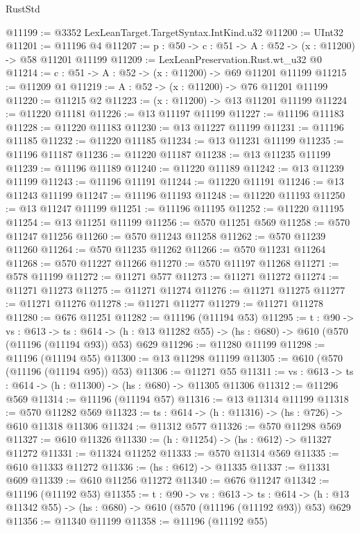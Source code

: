 \begin{lexlean}{RustStd}
\begin{coremodule}
@11199 := @3352 LexLeanTarget.TargetSyntax.IntKind.u32
@11200 := UInt32
@11201 := @11196 @4
@11207 := {p : @50} -> {c : @51} -> {A : @52} -> (x : @11200) -> @58 @11201 @11199
@11209 := LexLeanPreservation.Rust.wt_u32 @0
@11214 := {c : @51} -> {A : @52} -> (x : @11200) -> @69 @11201 @11199
@11215 := @11209 @1
@11219 := {A : @52} -> (x : @11200) -> @76 @11201 @11199
@11220 := @11215 @2
@11223 := (x : @11200) -> @13 @11201 @11199
@11224 := @11220 @11181
@11226 := @13 @11197 @11199
@11227 := @11196 @11183
@11228 := @11220 @11183
@11230 := @13 @11227 @11199
@11231 := @11196 @11185
@11232 := @11220 @11185
@11234 := @13 @11231 @11199
@11235 := @11196 @11187
@11236 := @11220 @11187
@11238 := @13 @11235 @11199
@11239 := @11196 @11189
@11240 := @11220 @11189
@11242 := @13 @11239 @11199
@11243 := @11196 @11191
@11244 := @11220 @11191
@11246 := @13 @11243 @11199
@11247 := @11196 @11193
@11248 := @11220 @11193
@11250 := @13 @11247 @11199
@11251 := @11196 @11195
@11252 := @11220 @11195
@11254 := @13 @11251 @11199
@11256 := @570 @11251 @569
@11258 := @570 @11247 @11256
@11260 := @570 @11243 @11258
@11262 := @570 @11239 @11260
@11264 := @570 @11235 @11262
@11266 := @570 @11231 @11264
@11268 := @570 @11227 @11266
@11270 := @570 @11197 @11268
@11271 := @578 @11199
@11272 := @11271 @577
@11273 := @11271 @11272
@11274 := @11271 @11273
@11275 := @11271 @11274
@11276 := @11271 @11275
@11277 := @11271 @11276
@11278 := @11271 @11277
@11279 := @11271 @11278
@11280 := @676 @11251
@11282 := @11196 (@11194 @53)
@11295 := {t : @90} ->
  {vs : @613} ->
  {ts : @614} -> (h : @13 @11282 @55) -> (hs : @680) -> @610 (@570 (@11196 (@11194 @93)) @53) @629
@11296 := @11280 @11199
@11298 := @11196 (@11194 @55)
@11300 := @13 @11298 @11199
@11305 := @610 (@570 (@11196 (@11194 @95)) @53)
@11306 := @11271 @55
@11311 := {vs : @613} -> {ts : @614} -> (h : @11300) -> (hs : @680) -> @11305 @11306
@11312 := @11296 @569
@11314 := @11196 (@11194 @57)
@11316 := @13 @11314 @11199
@11318 := @570 @11282 @569
@11323 := {ts : @614} -> (h : @11316) -> (hs : @726) -> @610 @11318 @11306
@11324 := @11312 @577
@11326 := @570 @11298 @569
@11327 := @610 @11326
@11330 := (h : @11254) -> (hs : @612) -> @11327 @11272
@11331 := @11324 @11252
@11333 := @570 @11314 @569
@11335 := @610 @11333 @11272
@11336 := (hs : @612) -> @11335
@11337 := @11331 @609
@11339 := @610 @11256 @11272
@11340 := @676 @11247
@11342 := @11196 (@11192 @53)
@11355 := {t : @90} ->
  {vs : @613} ->
  {ts : @614} -> (h : @13 @11342 @55) -> (hs : @680) -> @610 (@570 (@11196 (@11192 @93)) @53) @629
@11356 := @11340 @11199
@11358 := @11196 (@11192 @55)

\end{coremodule}
\end{lexlean}
